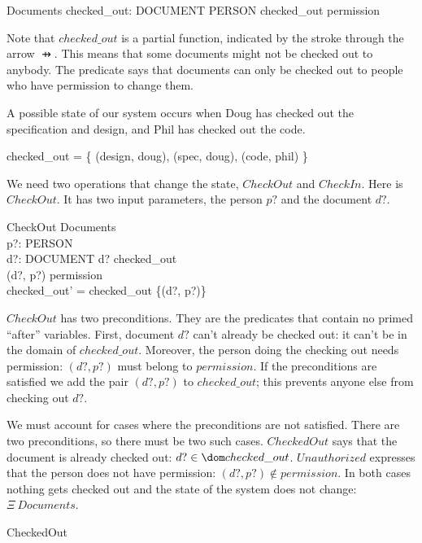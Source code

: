 \documentclass{article}
\begin{document}
\begin{schema}{Documents}
	checked\_out: DOCUMENT \pfun PERSON
\where
	checked\_out \subseteq permission
\end{schema}
Note that $checked\_out$ is a partial function, indicated by the stroke
through the arrow $\pfun$.  This means that some documents might not be
checked out to anybody.  The predicate says that documents can only be
checked out to people who have permission to change them.

A possible state of our system occurs when Doug has checked out the
specification and design, and Phil has checked out the code.

\begin{zed} 
	checked\_out = \{ (design, doug), (spec, doug), (code, phil) \}
\end{zed}

We need two operations that change the state, $CheckOut$ and $CheckIn$.
Here is $CheckOut$.  It has two input parameters, the person $p?$ and the document $d?$.

\begin{schema}{CheckOut}
	\Delta Documents \\
	p?: PERSON \\
	d?: DOCUMENT
\where
	d? \notin \dom checked\_out \\
	(d?, p?) \in permission \\
	checked\_out' = checked\_out \cup \{(d?, p?)\}
\end{schema}
$CheckOut$ has two preconditions.  They are the predicates that contain
no primed ``after'' variables.  First, document $d?$ can't already be checked
out: it can't be in the domain of $checked\_out$.  Moreover, the person
doing the checking out needs permission:  $(d?, p?)$ must belong to
$permission$.  If the preconditions are satisfied we add the pair $(d?,p?)$
to $checked\_out$; this prevents anyone else from checking out $d?$.

We must account for cases where the preconditions are not satisfied.
There are two preconditions, so there must be two such cases.
$CheckedOut$ says that the document is already checked out: $d? \in
\dom checked\_out$.  $Unauthorized$ expresses that the person does not 
have permission: $(d?,p?) \notin permission$.  In both cases nothing
gets checked out and the state of the system does not change:
$\Xi~Documents$.

\begin{zed}
CheckedOut 
\end{zed}
\end{document}
